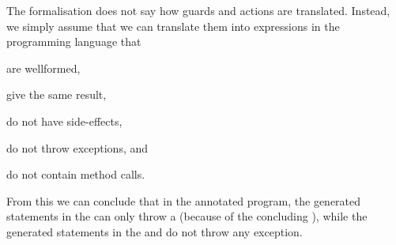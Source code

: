 
The formalisation does not say how guards and actions are
translated. Instead, we simply assume that we can translate them
into expressions in the programming language that
\begin{inparaenum}
\item are wellformed,
\item give the same result,
\item do not have side-effects,
\item do not throw exceptions, and
\item do not contain method calls.
\end{inparaenum}
From this we can conclude that in the annotated program, the generated
statements in the \preset can only throw a \JMLExc (because of the
concluding \Assert), while the generated statements in the \postset
and \excset do not throw any exception.

